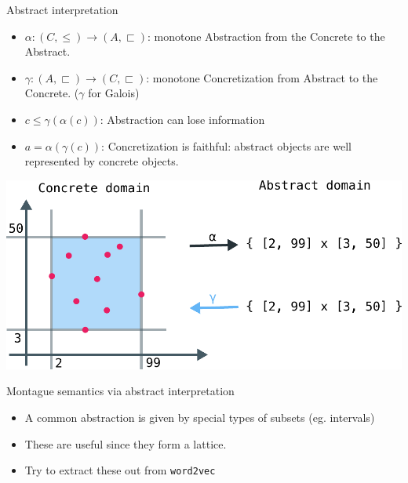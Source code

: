 \documentclass[8pt]{beamer}
\begin{document}
\begin{frame}{Abstract interpretation}
\begin{itemize}
    \item $\alpha: (C, \leq) \to (A, \sqsubset)$: monotone Abstraction from the Concrete to the Abstract.
    \item $\gamma: (A, \sqsubset) \to (C, \sqsubset)$: monotone Concretization from Abstract to the Concrete. ($\gamma$ for Galois)
    \item $c \leq \gamma(\alpha(c))$: Abstraction can lose information
    \item $a = \alpha(\gamma(c))$: Concretization is faithful: abstract objects are well represented by concrete objects.
\end{itemize}

\includegraphics[width=0.8 \textwidth]{../alpha-gamma-intervals.pdf}
\end{frame}

\begin{frame}{Montague semantics via abstract interpretation}
\begin{itemize}
  \item A common abstraction is given by special types of subsets (eg. intervals)
  \item These are useful since they form a lattice.
  \item Try to extract these out from \texttt{word2vec}
\end{itemize}
\end{frame}
\end{document}
